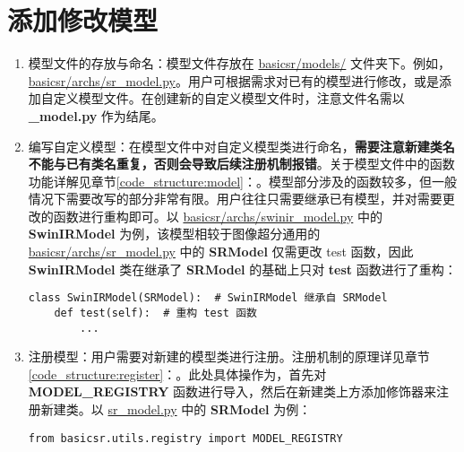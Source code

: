 \documentclass[../main.tex]{subfiles}
\begin{document}
\section{添加修改模型}\label{howto:add_model}

\begin{enumerate}[第 1 步]
    \item 模型文件的存放与命名：模型文件存放在 \href{https://github.com/XPixelGroup/BasicSR/tree/master/basicsr/models}{basicsr/models/} 文件夹下。例如，\href{https://github.com/XPixelGroup/BasicSR/tree/master/basicsr/models}{basicsr/archs/sr\_model.py}。用户可根据需求对已有的模型进行修改，或是添加自定义模型文件。在创建新的自定义模型文件时，注意文件名需以  \textbf{\_model.py} 作为结尾。

    \item 编写自定义模型：在模型文件中对自定义模型类进行命名，\textbf{需要注意新建类名不能与已有类名重复，否则会导致后续注册机制报错}。关于模型文件中的函数功能详解见章节\ref{code_structure:model}：。模型部分涉及的函数较多，但一般情况下需要改写的部分非常有限。用户往往只需要继承已有模型，并对需要更改的函数进行重构即可。以 \href{https://github.com/XPixelGroup/BasicSR/tree/master/basicsr/models}{basicsr/archs/swinir\_model.py} 中的 \textbf{SwinIRModel} 为例，该模型相较于图像超分通用的 \href{https://github.com/XPixelGroup/BasicSR/tree/master/basicsr/models}{basicsr/archs/sr\_model.py} 中的 \textbf{SRModel} 仅需更改 test 函数，因此 \textbf{SwinIRModel} 类在继承了 \textbf{SRModel} 的基础上只对 \textbf{test} 函数进行了重构：

\begin{verbatim}
class SwinIRModel(SRModel):  # SwinIRModel 继承自 SRModel
    def test(self):  # 重构 test 函数
        ...
\end{verbatim}

    \item 注册模型：用户需要对新建的模型类进行注册。注册机制的原理详见章节\ref{code_structure:register}：。此处具体操作为，首先对 \textbf{MODEL\_REGISTRY} 函数进行导入，然后在新建类上方添加修饰器来注册新建类。以 \href{https://github.com/XPixelGroup/BasicSR/tree/master/basicsr/models/sr_model.py}{sr\_model.py} 中的 \textbf{SRModel} 为例：

\begin{verbatim}
from basicsr.utils.registry import MODEL_REGISTRY


\end{verbatim}
\end{enumerate}
\end{document}
